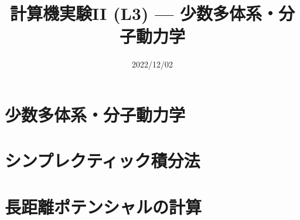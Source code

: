 \documentclass[10pt,dvipdfmx]{beamer}
\title{計算機実験II (L3) --- 少数多体系・分子動力学}
\date{2022/12/02}
\begin{document}
\begin{frame}
  \titlepage
  \tableofcontents
\end{frame}



\section{少数多体系・分子動力学}



%
%






\section{シンプレクティック積分法}
















%
%

\section{長距離ポテンシャルの計算}
\end{document}
